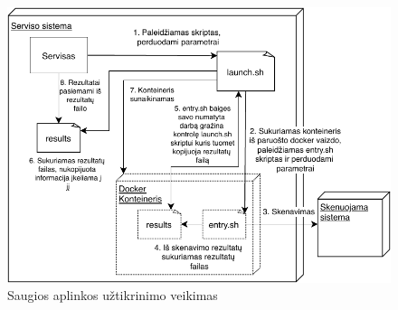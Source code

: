 \documentclass[a4paper,12pt,fleqn]{article}
\begin{document}
\begin{figure}[H]
	\centering
	\includegraphics[width=1\textwidth]{figs/docker.pdf}
	\caption{Saugios aplinkos užtikrinimo veikimas}
	\label{fig:docker}
\end{figure}
\end{document}
